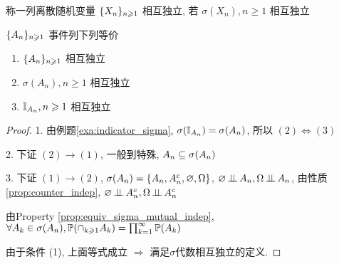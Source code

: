 \begin{definition}
    称一列离散随机变量 $\{{X}_{n}\}_{n \geqslant 1}$ 相互独立, 若 $\sigma(X_n), n\geq 1$ 相互独立
\end{definition}

\begin{theorem}\label{thm:1.3}
    $\{{A}_{n}\}_{n \geqslant 1}$ 事件列下列等价
    \begin{enumerate}
        \item $\{{A}_{n}\}_{n \geqslant 1}$ 相互独立
        \item $\sigma(A_n), n\geq 1$ 相互独立
        \item $\mathbb I_{A_n}, n\geqslant 1$ 相互独立
    \end{enumerate}
\end{theorem}
\begin{proof}
1. 由例题\ref{exa:indicator_sigma}, $\sigma(\mathbb I_{A_n})=\sigma(A_n)$, 所以 $(2)\Leftrightarrow (3)$

2. 下证 $(2)\rightarrow (1)$, 一般到特殊, $A_n\subseteq \sigma(A_n)$

3. 下证 $(1)\rightarrow (2)$, $\sigma(A_n)=\{A_n,A_n^c, \varnothing, \Omega\}$, $\varnothing\operatorname{\perp\!\!\!\perp} A_n, \Omega\operatorname{\perp\!\!\!\perp} A_n$, 由性质\ref{prop:counter_indep}, $\varnothing\operatorname{\perp\!\!\!\perp} A_n^c, \Omega\operatorname{\perp\!\!\!\perp} A_n^c$

由Property \ref{prop:equiv_sigma_mutual_indep}, $\forall A_k\in \sigma(A_n), \mathbb{P}(\cap_{k\geqslant 1}A_k)=\prod_{k=1}^{\infty}\mathbb{P}(A_k)$

由于条件 (1), 上面等式成立 $\Rightarrow$ 满足$\sigma$代数相互独立的定义.
\end{proof}

\newpage